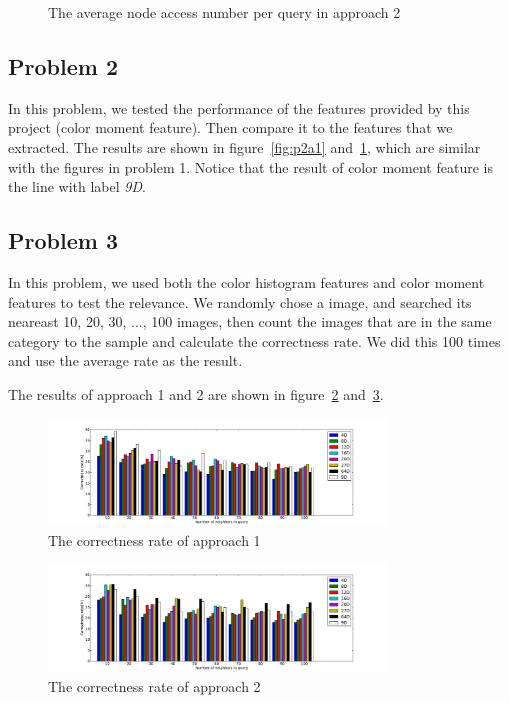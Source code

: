 \documentclass{acm_proc_article-sp}
\begin{document}
\begin{figure}
\centering
{}
\caption{The average node access number per query in approach 2}
\label{fig:p2a2}
\end{figure}

\subsection{Problem 2}
In this problem, we tested the performance of the features provided by this project (color moment feature). Then compare it to the features that we extracted. The results are shown in figure~\ref{fig:p2a1} and~\ref{fig:p2a2}, which are similar with the figures in problem 1. Notice that the result of color moment feature is the line with label \textit{9D}.

\subsection{Problem 3}
\label{problem3}
In this problem, we used both the color histogram features and color moment features to test the relevance. We randomly chose a image, and searched its neareast 10, 20, 30, ..., 100 images, then count the images that are in the same category to the sample and calculate the correctness rate. We did this 100 times and use the average rate as the result.

The results of approach 1 and 2 are shown in figure~\ref{fig:p3a1} and~\ref{fig:p3a2}.

\begin{figure}
\centering
\includegraphics[width=0.8\textwidth]{p3a1.pdf}
\caption{The correctness rate of approach 1}
\label{fig:p3a1}
\end{figure}

\begin{figure}
\centering
\includegraphics[width=0.8\textwidth]{p3a2.pdf}
\caption{The correctness rate of approach 2}
\label{fig:p3a2}
\end{figure}
\end{document}
